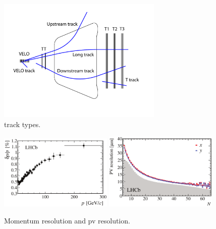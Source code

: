 \begin{figure}[t]
  \centering
  \includegraphics[width=0.7\textwidth]{Figures/Chapter2/trackTypesRunIAndII}
  \caption{\lhcb track types.}
  \label{track_types}
\end{figure}

\begin{figure}[t]
  \centering
  \includegraphics[width=0.48\textwidth]{Figures/Chapter2/dppVsp-crop-cmyk}
  \includegraphics[width=0.48\textwidth]{Figures/Chapter2/DataResXY_1PV_2012-crop-cmyk.pdf}
  \caption{\lhcb Momentum resolution and pv resolution.}
  \label{det_deltappvp}
\end{figure}
